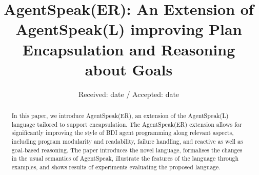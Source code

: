\documentclass[smallextended]{svjour3}       %
\begin{document}
\title{AgentSpeak(ER): An Extension of AgentSpeak(L) improving Plan Encapsulation and Reasoning about Goals
}


\author{}



\date{Received: date / Accepted: date}


\maketitle

\begin{abstract}
In this paper, we introduce AgentSpeak(ER), an extension of the AgentSpeak(L) language tailored to support encapsulation. 
%
The AgentSpeak(ER) extension allows for significantly improving the style of BDI agent programming along relevant aspects, including program modularity and readability, failure handling, and reactive as well as goal-based reasoning. 
%
The paper introduces the novel language, formalises the changes in the usual semantics of AgentSpeak, illustrate the features of the language through examples, and shows results of experiments evaluating the proposed language.
\end{abstract}













\end{document}
